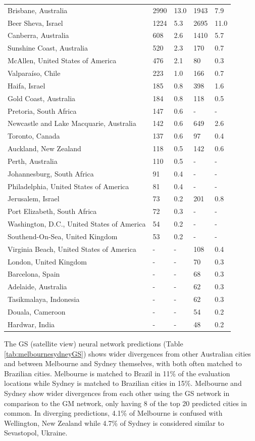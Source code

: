 \documentclass[Crown,sageh,times]{sagej}
\begin{document}
\begin{table}[!htbp]
\begin{tabular}{ l l l l l}
Brisbane, Australia&2990&13.0&1943&	7.9\\
Beer Sheva, Israel&	1224&5.3&2695&	11.0\\
Canberra, Australia&608	&2.6&1410&	5.7\\
Sunshine Coast, Australia&520	&2.3&170&	0.7\\
McAllen, United States of America&	476&	2.1&	80&	0.3\\
Valpara\'{i}so, Chile&	223&	1.0&166&	0.7\\
Haifa, Israel&	185&	0.8&398	&1.6\\	
Gold Coast, Australia&	184&	0.8&118&	0.5\\
Pretoria, South Africa&	147&	0.6& - & -      \\
Newcastle and Lake Macquarie, Australia&142	&0.6&649&	2.6\\
Toronto, Canada&	137	&0.6&97&	0.4\\
Auckland, New Zealand&	118&	0.5&142&	0.6\\
Perth, Australia&	110&	0.5& - & -      \\
Johannesburg, South Africa&	91&	0.4& - & -      \\
Philadelphia, United States of America&	81&	0.4& - & -      \\
Jerusalem, Israel&	73&	0.2&201&	0.8\\
Port Elizabeth, South Africa&	72&	0.3& - & -      \\
Washington, D.C., United States of America&	54&	0.2& - & -      \\
Southend-On-Sea, United Kingdom&	53&	0.2& - & -      \\
Virginia Beach, United States of America&-&-&	108&	0.4\\
London, United Kingdom&-&-&	70&	0.3\\
Barcelona, Spain&-&-&	68&	0.3\\
Adelaide, Australia&-&-&	62&	0.3\\
Tasikmalaya, Indonesia&-&-&	62&	0.3\\
Douala, Cameroon&-&-&	54&	0.2\\
Hardwar, India&-&-&	48&	0.2\\
\hline
\end{tabular}
\end{table}

The GS (satellite view) neural network predictions (Table \ref{tab:melbournesydneyGS}) shows wider divergences from other Australian cities and between Melbourne and Sydney themselves, with both often matched to Brazilian cities. Melbourne is matched to Brazil in 11\% of the evaluation locations while Sydney is matched to Brazilian cities in 15\%. Melbourne and Sydney show wider divergences from each other using the GS network in comparison to the GM network, only having 8 of the top 20 predicted cities in common. In diverging predictions, 4.1\% of Melbourne is confused with Wellington, New Zealand while 4.7\% of Sydney is considered similar to Sevastopol, Ukraine. 
\end{document}
